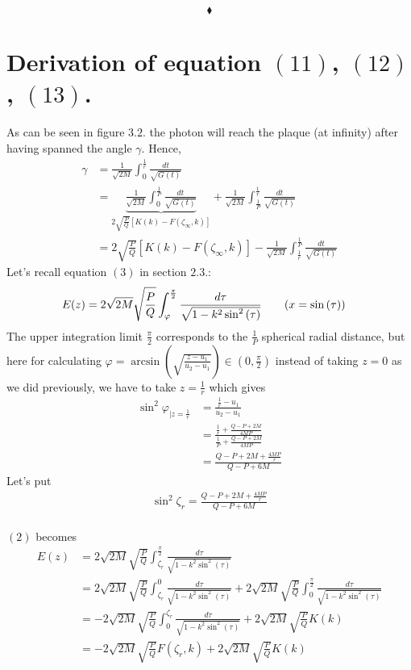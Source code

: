 $$\blacklozenge$$\newpage
\section{Derivation of equation $(11)$,  $(12)$, $(13)$.}
As can be seen in figure $3.2.$ the photon will reach the plaque (at infinity) after having spanned the angle $\gamma$. Hence,
\begin{align}
\gamma&= \frac{1}{\sqrt{2M}}\int_{0}^{\frac{1}{r}}\frac{dt}{\sqrt{G(t)}}\nonumber \\
&= \underbrace{\frac{1}{\sqrt{2M}}\int_{0}^{\frac{1}{P}}\frac{dt}{\sqrt{G(t)}}}_{2\sqrt{\frac{P}{Q}}\left[K{\left(k\right)}-F{\left(\zeta_{\infty},k\right)}\right]}+\frac{1}{\sqrt{2M}}\int_{\frac{1}{P}}^{\frac{1}{r}}\frac{dt}{\sqrt{G(t)}}\nonumber \\
&=2\sqrt{\frac{P}{Q}}\left[K{\left(k\right)}-F{\left(\zeta_{\infty},k\right)}\right]-\frac{1}{\sqrt{2M}}\int^{\frac{1}{P}}_{\frac{1}{r}}\frac{dt}{\sqrt{G(t)}}
\end{align}
Let's recall equation $(3)$ in section $2.3.$:
\begin{align}
E(z)
&=2\sqrt{2M}\sqrt{\frac{P}{Q}}\int_{\varphi}^{\frac{\pi}{2}}\frac{d\tau}{\sqrt{1-k^{2}\sin^{2}{\left(\tau\right)}}}\quad\quad\small{\left(x=\sin{\left(\tau\right)}\right)}
\end{align}
The upper integration limit $\frac{\pi}{2}$ corresponds to the $\frac{1}{P}$ spherical radial distance, but here for calculating  $\varphi=\arcsin{\left(\sqrt{\frac{z-u_1}{u_2-u_1}}\right)}\in\left(0,\frac{\pi}{2}\right)$ instead of taking $z=0$ as we did previously, we have to take $z=\frac{1}{r}$ which gives 
\begin{align}
\sin^2{\varphi}_{|z=\frac{1}{r}}&=\frac{\frac{1}{r}-u_1}{u_2-u_1}\nonumber \\
&=\frac{\frac{1}{r}+\frac{Q-P+2M}{4MP}}{\frac{1}{P}+\frac{Q-P+2M}{4MP}}\nonumber \\
&=\frac{Q-P+2M+\frac{4MP}{r}}{Q-P+6M}
\end{align}
Let's put \begin{align}\sin^2{\zeta_{r}}=\frac{Q-P+2M+\frac{4MP}{r}}{Q-P+6M}\end{align}\\
$(2)$ becomes
\begin{align}
E(z)
&=2\sqrt{2M}\sqrt{\frac{P}{Q}}\int_{\zeta_{r}}^{\frac{\pi}{2}}\frac{d\tau}{\sqrt{1-k^{2}\sin^{2}{\left(\tau\right)}}}\nonumber \\
&= 2\sqrt{2M}\sqrt{\frac{P}{Q}}\int_{\zeta_{r}}^{0}\frac{d\tau}{\sqrt{1-k^{2}\sin^{2}{\left(\tau\right)}}}+2\sqrt{2M}\sqrt{\frac{P}{Q}}\int_{0}^{\frac{\pi}{2}}\frac{d\tau}{\sqrt{1-k^{2}\sin^{2}{\left(\tau\right)}}}\nonumber \\
&= -2\sqrt{2M}\sqrt{\frac{P}{Q}}\int^{\zeta_{r}}_{0}\frac{d\tau}{\sqrt{1-k^{2}\sin^{2}{\left(\tau\right)}}}+2\sqrt{2M}\sqrt{\frac{P}{Q}}K{\left(k\right)}\nonumber \\
&= -2\sqrt{2M}\sqrt{\frac{P}{Q}}F{\left(\zeta_{r},k\right)}+2\sqrt{2M}\sqrt{\frac{P}{Q}}K{\left(k\right)}
\end{align}
